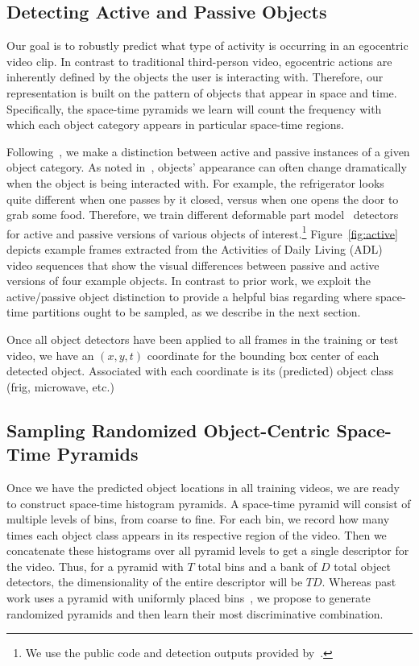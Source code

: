  \vspace*{-0.05in}
\subsection{Detecting Active and Passive Objects}

Our goal is to robustly predict what type of activity is occurring in an egocentric video clip.  In contrast to traditional third-person video, egocentric actions are inherently defined by the objects the user is interacting with. Therefore, our representation is built on the pattern of objects that appear in space and time.  Specifically, the space-time pyramids we learn will count the frequency with which each object category appears in particular space-time regions.

Following~\cite{Ramanan12}, we make a distinction between active and passive instances of a given object category.  As noted in~\cite{Ramanan12}, objects' appearance can often change dramatically when the object is being interacted with.  For example, the refrigerator looks quite different when one passes by it closed, versus when one opens the door to grab some food.  Therefore, we train different deformable part model~\cite{DPM} detectors for active and passive versions of various objects of interest.\footnote{We use the public code and detection outputs provided by~\cite{Ramanan12}.}  Figure~\ref{fig:active} depicts example frames extracted from
the Activities of Daily Living (ADL)~\cite{Ramanan12} video sequences that show the visual differences between passive and
  active versions of four example objects.  In contrast to prior work, we exploit the active/passive object distinction to provide a helpful bias regarding where space-time partitions ought to be sampled, as we describe in the next section.
  
Once all object detectors have been applied to all frames in the training or test video, we have an $(x,y,t)$ coordinate for the bounding box center of each detected object.  Associated with each coordinate is its (predicted) object class (frig, microwave, etc.)


\subsection{Sampling Randomized Object-Centric Space-Time Pyramids}

Once we have the predicted object locations in all training videos, we are ready to construct space-time histogram pyramids.  A space-time pyramid will consist of multiple levels of bins, from coarse to fine.  For each bin, we record how many times each object class appears in its respective region of the video.  Then we concatenate these histograms over all pyramid levels to get a single descriptor for the video.  Thus, for a pyramid with $T$ total bins and a bank of $D$ total object detectors, the dimensionality of the entire descriptor will be $TD$.  Whereas past work uses a pyramid with uniformly placed bins~\cite{Choi08,Ramanan12}, we propose to generate randomized pyramids and then learn their most discriminative combination.

